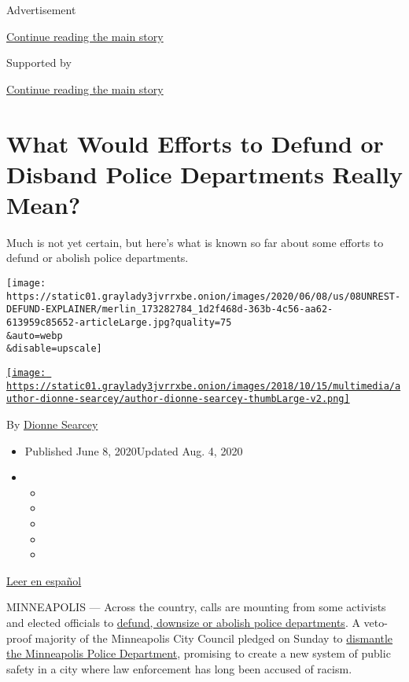 Advertisement

\protect\hyperlink{after-top}{Continue reading the main story}

Supported by

\protect\hyperlink{after-sponsor}{Continue reading the main story}

\hypertarget{what-would-efforts-to-defund-or-disband-police-departments-really-mean}{%
\section{What Would Efforts to Defund or Disband Police Departments
Really
Mean?}\label{what-would-efforts-to-defund-or-disband-police-departments-really-mean}}

Much is not yet certain, but here's what is known so far about some
efforts to defund or abolish police departments.

\texttt{[image: https://static01.graylady3jvrrxbe.onion/images/2020/06/08/us/08UNREST-DEFUND-EXPLAINER/merlin\_173282784\_1d2f468d-363b-4c56-aa62-613959c85652-articleLarge.jpg?quality=75\\\&auto=webp\\\&disable=upscale]}

\href{https://www.nytimes3xbfgragh.onion/by/dionne-searcey}{\texttt{[image: https://static01.graylady3jvrrxbe.onion/images/2018/10/15/multimedia/author-dionne-searcey/author-dionne-searcey-thumbLarge-v2.png]}}

By \href{https://www.nytimes3xbfgragh.onion/by/dionne-searcey}{Dionne
Searcey}

\begin{itemize}
\item
  Published June 8, 2020Updated Aug. 4, 2020
\item
  \begin{itemize}
  \item
  \item
  \item
  \item
  \item
  \end{itemize}
\end{itemize}

\href{https://www.nytimes3xbfgragh.onion/es/2020/06/10/espanol/desfinanciar-policia.html}{Leer
en español}

MINNEAPOLIS --- Across the country, calls are mounting from some
activists and elected officials to
\href{https://www.nytimes3xbfgragh.onion/2020/08/04/us/minneapolis-defund-police.html}{defund,
downsize or abolish police departments}. A veto-proof majority of the
Minneapolis City Council pledged on Sunday to
\href{https://www.nytimes3xbfgragh.onion/2020/06/07/us/minneapolis-police-abolish.html}{dismantle
the Minneapolis Police Department}, promising to create a new system of
public safety in a city where law enforcement has long been accused of
racism.


